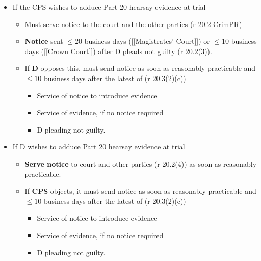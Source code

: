 \documentclass[
]{article}
\providecommand{\tightlist}{%
  \setlength{\itemsep}{0pt}\setlength{\parskip}{0pt}}
\begin{document}
\begin{itemize}
\tightlist
\item
  If the CPS wishes to adduce Part 20 hearsay evidence at trial

  \begin{itemize}
  \tightlist
  \item
    Must serve notice to the court and the other parties (r 20.2 CrimPR)
  \item
    \textbf{Notice} sent \(\leq 20\) business days ({[}{[}Magistrates'
    Court{]}{]}) or \(\leq 10\) business days ({[}{[}Crown Court{]}{]})
    after D pleads not guilty (r 20.2(3)).
  \item
    If \textbf{D} opposes this, must send notice as soon as reasonably
    practicable and \(\leq 10\) business days after the latest of (r
    20.3(2)(c))

    \begin{itemize}
    \tightlist
    \item
      Service of notice to introduce evidence
    \item
      Service of evidence, if no notice required
    \item
      D pleading not guilty.
    \end{itemize}
  \end{itemize}
\item
  If D wishes to adduce Part 20 hearsay evidence at trial

  \begin{itemize}
  \tightlist
  \item
    \textbf{Serve notice} to court and other parties (r 20.2(4)) as soon
    as reasonably practicable.
  \item
    If \textbf{CPS} objects, it must send notice as soon as reasonably
    practicable and \(\leq 10\) business days after the latest of (r
    20.3(2)(c))

    \begin{itemize}
    \tightlist
    \item
      Service of notice to introduce evidence
    \item
      Service of evidence, if no notice required
    \item
      D pleading not guilty.
    \end{itemize}
  \end{itemize}
\end{itemize}
\end{document}
